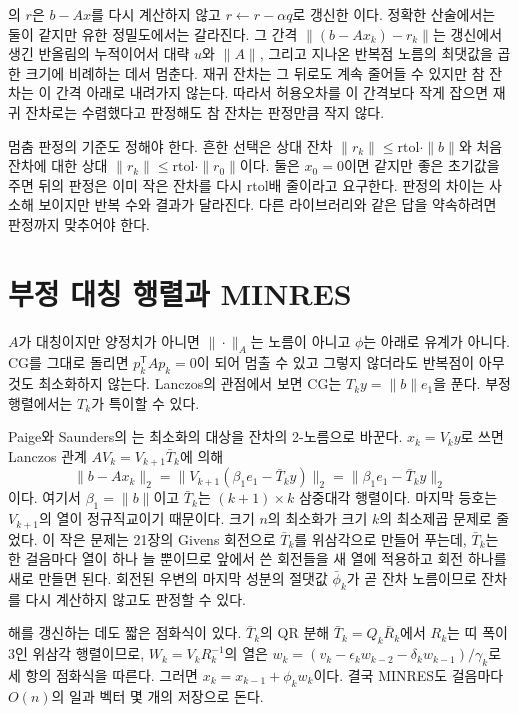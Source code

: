 의 $r$은 $b-Ax$를 다시 계산하지 않고 $r\gets r-\alpha q$로 갱신한 이다. 정확한 산술에서는 둘이 같지만 유한 정밀도에서는 갈라진다. 그 간격 $\|(b-Ax_k)-r_k\|$는 갱신에서 생긴 반올림의 누적이어서 대략 $u$와 $\|A\|$, 그리고 지나온 반복점 노름의 최댓값을 곱한 크기에 비례하는 데서 멈춘다\cite{greenbaum1997iterative}. 재귀 잔차는 그 뒤로도 계속 줄어들 수 있지만 참 잔차는 이 간격 아래로 내려가지 않는다. 따라서 허용오차를 이 간격보다 작게 잡으면 재귀 잔차로는 수렴했다고 판정해도 참 잔차는 판정만큼 작지 않다.

멈춤 판정의 기준도 정해야 한다. 흔한 선택은 상대 잔차 $\|r_k\|\le\mathrm{rtol}\cdot\|b\|$와 처음 잔차에 대한 상대 $\|r_k\|\le\mathrm{rtol}\cdot\|r_0\|$이다. 둘은 $x_0=0$이면 같지만 좋은 초기값을 주면 뒤의 판정은 이미 작은 잔차를 다시 $\mathrm{rtol}$배 줄이라고 요구한다. 판정의 차이는 사소해 보이지만 반복 수와 결과가 달라진다. 다른 라이브러리와 같은 답을 약속하려면 판정까지 맞추어야 한다.

\section{부정 대칭 행렬과 MINRES}
\label{sec:minres}

$A$가 대칭이지만 양정치가 아니면 $\|\cdot\|_A$는 노름이 아니고 $\phi$는 아래로 유계가 아니다. CG를 그대로 돌리면 $p_k^{\mathsf T}Ap_k=0$이 되어 멈출 수 있고 그렇지 않더라도 반복점이 아무것도 최소화하지 않는다. Lanczos의 관점에서 보면 CG는 $T_ky=\|b\|e_1$을 푼다. 부정 행렬에서는 $T_k$가 특이할 수 있다.

Paige와 Saunders의 는 최소화의 대상을 잔차의 2-노름으로 바꾼다\cite{paige1975}. $x_k=V_ky$로 쓰면 Lanczos 관계 $AV_k=V_{k+1}\bar T_k$에 의해
\[
\|b-Ax_k\|_2=\|V_{k+1}(\beta_1e_1-\bar T_ky)\|_2=\|\beta_1e_1-\bar T_ky\|_2
\]
이다. 여기서 $\beta_1=\|b\|$이고 $\bar T_k$는 $(k+1)\times k$ 삼중대각 행렬이다. 마지막 등호는 $V_{k+1}$의 열이 정규직교이기 때문이다. 크기 $n$의 최소화가 크기 $k$의 최소제곱 문제로 줄었다. 이 작은 문제는 21장의 Givens 회전으로 $\bar T_k$를 위삼각으로 만들어 푸는데, $\bar T_k$는 한 걸음마다 열이 하나 늘 뿐이므로 앞에서 쓴 회전들을 새 열에 적용하고 회전 하나를 새로 만들면 된다. 회전된 우변의 마지막 성분의 절댓값 $\bar\phi_k$가 곧 잔차 노름이므로 잔차를 다시 계산하지 않고도 판정할 수 있다.

해를 갱신하는 데도 짧은 점화식이 있다. $\bar T_k$의 QR 분해 $\bar T_k=Q_k\bar R_k$에서 $R_k$는 띠 폭이 $3$인 위삼각 행렬이므로, $W_k=V_kR_k^{-1}$의 열은 $w_k=(v_k-\epsilon_kw_{k-2}-\delta_kw_{k-1})/\gamma_k$로 세 항의 점화식을 따른다. 그러면 $x_k=x_{k-1}+\phi_kw_k$이다. 결국 MINRES도 걸음마다 $O(n)$의 일과 벡터 몇 개의 저장으로 돈다.

